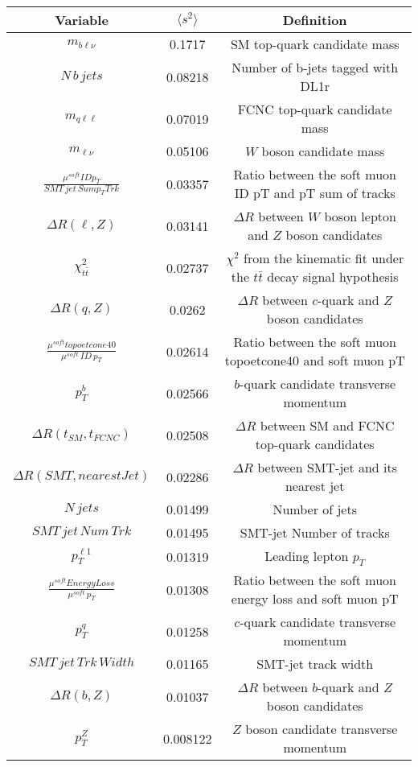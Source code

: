 \documentclass[a4paper]{article}
\begin{document}
\begin{tabular}{ccc}
\toprule
Variable & $\langle s^{2}\rangle$  & Definition \\
\midrule
$m_{b\ell\nu}$  &  0.1717  &  SM top-quark candidate mass  \\
$N\,b\,jets$  &  0.08218  &  Number of b-jets tagged with DL1r  \\
$m_{q\ell\ell}$  &  0.07019  &  FCNC top-quark candidate mass  \\
$m_{\ell\nu}$  &  0.05106  &  $W$ boson candidate mass  \\
$\frac{\mu^{soft} ID p_{T}}{SMT\,jet\,Sum p_{T} Trk}$  &  0.03357  &  Ratio between the soft muon ID pT and pT sum of tracks  \\
$\Delta R(\ell,Z)$  &  0.03141  &  $\Delta R$ between $W$ boson lepton and $Z$ boson candidates  \\
$\chi^2_{t\bar{t}}$  &  0.02737  &  $\chi^2$ from the kinematic fit under the $t\bar{t}$ decay signal hypothesis  \\
$\Delta R(q,Z)$  &  0.0262  &  $\Delta R$ between $c$-quark and $Z$ boson candidates  \\
$\frac{\mu^{soft} topoetcone40}{\mu^{soft}\,ID\,p_{T}}$  &  0.02614  &  Ratio between the soft muon topoetcone40 and soft muon pT  \\
$p_{T}^{b}$  &  0.02566  &  $b$-quark candidate transverse momentum  \\
$\Delta R(t_{SM},t_{FCNC})$  &  0.02508  &  $\Delta R$ between SM and FCNC top-quark candidates  \\
$\Delta R(SMT,nearestJet)$   &  0.02286  &  $\Delta R$ between SMT-jet and its nearest jet  \\
$N\,jets$  &  0.01499  &  Number of jets  \\
$SMT\,jet\,Num\,Trk$  &  0.01495  &  SMT-jet Number of tracks  \\
$p_{T}^{\ell1}$  &  0.01319  &  Leading lepton $p_{T}$  \\
$\frac{\mu^{soft} Energy Loss}{\mu^{soft}\,p_{T}} $  &  0.01308  &  Ratio between the soft muon energy loss and soft muon pT  \\
$p_{T}^{q}$  &  0.01258  &  $c$-quark candidate transverse momentum  \\
$SMT\,jet\,Trk\,Width$  &  0.01165  &  SMT-jet track width  \\
$\Delta R(b,Z)$  &  0.01037  &  $\Delta R$ between $b$-quark and $Z$ boson candidates  \\
$p_{T}^{Z}$  &  0.008122  &  $Z$ boson candidate transverse momentum  \\

\end{tabular}
\end{document}
